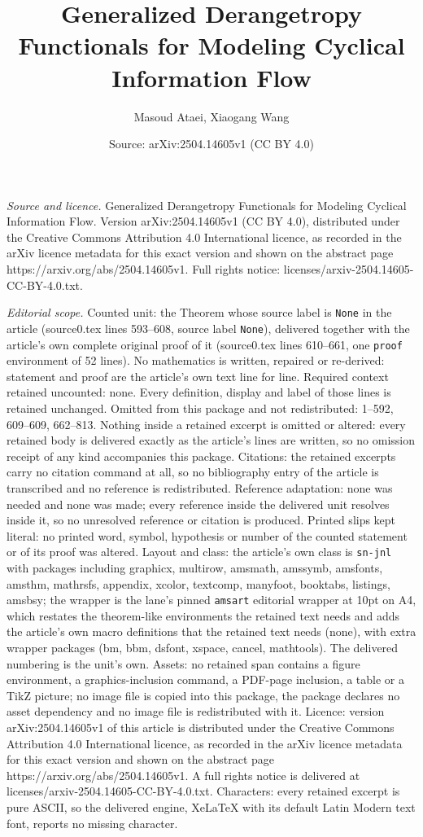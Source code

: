 \documentclass[10pt,a4paper]{amsart}
\title[Generalized Derangetropy Functionals for Modeling Cyclical I]{Generalized Derangetropy Functionals for Modeling Cyclical Information Flow}
\author{Masoud Ataei, Xiaogang Wang}
\date{Source: arXiv:2504.14605v1 (CC BY 4.0)}
\begin{document}
\maketitle

\noindent\emph{Source and licence.} Generalized Derangetropy Functionals for Modeling Cyclical Information Flow. Version arXiv:2504.14605v1 (CC BY 4.0), distributed under the Creative Commons Attribution 4.0 International licence, as recorded in the arXiv licence metadata for this exact version and shown on the abstract page https://arxiv.org/abs/2504.14605v1. Full rights notice: licenses/arxiv-2504.14605-CC-BY-4.0.txt.\par\smallskip

\noindent\textit{Editorial scope.} Counted unit: the Theorem whose source label is \texttt{None} in the article (source0.tex lines 593--608, source label \texttt{None}), delivered together with the article's own complete original proof of it (source0.tex lines 610--661, one \texttt{proof} environment of 52 lines). No mathematics is written, repaired or re-derived: statement and proof are the article's own text line for line. Required context retained uncounted: none. Every definition, display and label of those lines is retained unchanged. Omitted from this package and not redistributed: 1--592, 609--609, 662--813. Nothing inside a retained excerpt is omitted or altered: every retained body is delivered exactly as the article's lines are written, so no omission receipt of any kind accompanies this package. Citations: the retained excerpts carry no citation command at all, so no bibliography entry of the article is transcribed and no reference is redistributed. Reference adaptation: none was needed and none was made; every reference inside the delivered unit resolves inside it, so no unresolved reference or citation is produced. Printed slips kept literal: no printed word, symbol, hypothesis or number of the counted statement or of its proof was altered. Layout and class: the article's own class is \texttt{sn-jnl} with packages including graphicx, multirow, amsmath, amssymb, amsfonts, amsthm, mathrsfs, appendix, xcolor, textcomp, manyfoot, booktabs, listings, amsbsy; the wrapper is the lane's pinned \texttt{amsart} editorial wrapper at 10pt on A4, which restates the theorem-like environments the retained text needs and adds the article's own macro definitions that the retained text needs (none), with extra wrapper packages (bm, bbm, dsfont, xspace, cancel, mathtools). The delivered numbering is the unit's own. Assets: no retained span contains a figure environment, a graphics-inclusion command, a PDF-page inclusion, a table or a TikZ picture; no image file is copied into this package, the package declares no asset dependency and no image file is redistributed with it. Licence: version arXiv:2504.14605v1 of this article is distributed under the Creative Commons Attribution 4.0 International licence, as recorded in the arXiv licence metadata for this exact version and shown on the abstract page https://arxiv.org/abs/2504.14605v1. A full rights notice is delivered at licenses/arxiv-2504.14605-CC-BY-4.0.txt. Characters: every retained excerpt is pure ASCII, so the delivered engine, XeLaTeX with its default Latin Modern text font, reports no missing character.
\end{document}
